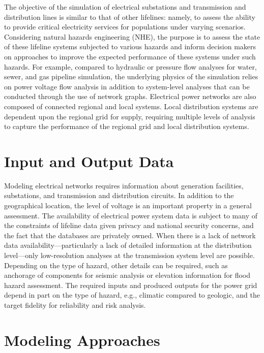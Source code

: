 The objective of the simulation of electrical substations and transmission and distribution lines is similar to that of other lifelines: namely, to assess the ability to provide critical electricity services for populations under varying scenarios. Considering natural hazards engineering (NHE), the purpose is to assess the state of these lifeline systems subjected to  various hazards and inform decision makers on approaches to improve the expected performance of these systems under such hazards. For example, compared to hydraulic or pressure flow analyses for water, sewer, and gas pipeline simulation, the underlying physics of the simulation relies on power voltage flow analysis in addition to system-level analyses that can be conducted through the use of network graphs. Electrical power networks are also composed of connected regional and local systems. Local distribution systems are dependent upon the regional grid for supply, requiring multiple levels of analysis to capture the performance of the regional grid and local distribution systems.
 
\section{Input and Output Data}
\label{sec:perf_power_io}

Modeling electrical networks requires information about generation facilities, substations, and transmission and distribution circuits. In addition to the geographical location, the level of voltage is an important property in a general assessment. The availability of electrical power system data is subject to many of the constraints of lifeline data given privacy and national security concerns, and the fact that the databases are privately owned. When there is a lack of network data availability---particularly a lack of detailed information at the distribution level---only low-resolution analyses at the transmission system level are possible. Depending on the type of hazard, other details can be required, such as anchorage of components for seismic analysis or elevation information for flood hazard assessment. The required inputs and produced outputs for the power grid depend in part on the type of hazard, e.g., climatic compared to geologic, and the target fidelity for reliability and risk analysis. 

\section{Modeling Approaches}
\label{sec:perf_power_methods}

